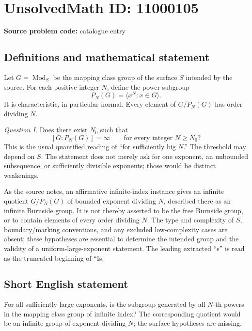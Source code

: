 \documentclass[11pt]{article}
\begin{document}
\section*{UnsolvedMath ID: 11000105}
\textbf{Source problem code:} catalogue entry
\subsection{Definitions and mathematical statement}
Let \(G=\operatorname{Mod}_S\) be the mapping class group of the surface \(S\) intended by the source. For each positive integer \(N\), define the power subgroup
\[
 P_N(G)=\langle x^N:x\in G\rangle.
\]
It is characteristic, in particular normal. Every element of \(G/P_N(G)\) has order dividing \(N\).

\emph{Question I.} Does there exist \(N_0\) such that
\[
 [G:P_N(G)]=\infty\qquad\text{for every integer }N\geq N_0?
\]
This is the usual quantified reading of ``for sufficiently big \(N\).'' The threshold may depend on \(S\). The statement does not merely ask for one exponent, an unbounded subsequence, or sufficiently divisible exponents; those would be distinct weakenings.

As the source notes, an affirmative infinite-index instance gives an infinite quotient \(G/P_N(G)\) of bounded exponent dividing \(N\), described there as an infinite Burnside group. It is not thereby asserted to be the free Burnside group, or to contain elements of every order dividing \(N\). The type and complexity of \(S\), boundary/marking conventions, and any excluded low-complexity cases are absent; these hypotheses are essential to determine the intended group and the validity of a uniform-large-exponent statement. The leading extracted ``s'' is read as the truncated beginning of ``Is.
\subsection{Short English statement}
For all sufficiently large exponents, is the subgroup generated by all \(N\)-th powers in the mapping class group of infinite index? The corresponding quotient would be an infinite group of exponent dividing \(N\); the surface hypotheses are missing.
\end{document}
